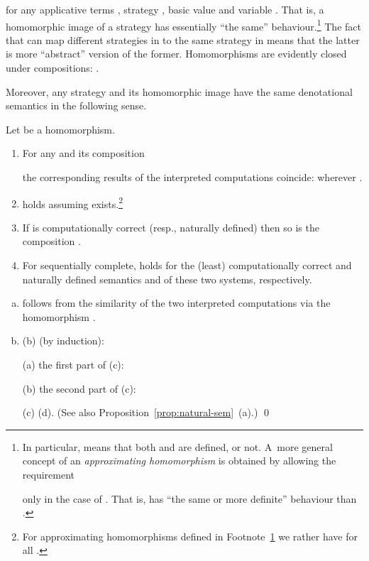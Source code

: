 \documentclass[fleqn]{LMCS}
\theoremstyle{plain}\newtheorem{satz}[thm]{Satz}
\theoremstyle{plain}\newtheorem{hyp}[thm]{Hypothesis}
\theoremstyle{plain}\newtheorem{hyps}[thm]{Hypotheses}
\theoremstyle{definition}\newtheorem{note}[thm]{Note}
\newcommand{\?}{\mbox{?}}
\begin{document}
for any applicative terms , strategy , basic value  and 
variable . 
That is, a homomorphic image of a strategy has essentially ``the same'' behaviour.\footnote{\label{foot:approx-hom} 
In particular,  means that both 
 and  are defined, or not. 
A~more general concept of an \emph{approximating homomorphism} 
is obtained by allowing the requirement 
 
only in the case of . 
That is,  has ``the same or more definite'' behaviour than .  
}
The fact that  can map different strategies in  to the same strategy 
in  means that the latter is more ``abstract'' version of the former. 
Homomorphisms are evidently closed under compositions: 
.


 
Moreover, any strategy  and its homomorphic image  
have the same denotational semantics in the following sense. 
\begin{prop}\label{prop:homomorphism-and-semantics}
Let  be a homomorphism. 
\begin{enumerate}[\em(a)]
\item For any  and its composition 

the corresponding results of 
the interpreted computations coincide:  
wherever . 

\item  holds
assuming 
 exists.\footnote{For approximating homomorphisms defined in Footnote~\ref{foot:approx-hom} 
we rather have 
 for all .
}



\item If  is computationally correct 
(resp., naturally defined) then so is the composition 
. 

\item For  
sequentially complete, 
 holds 
for the (least) computationally correct and naturally defined semantics 
 and  of these two systems, respectively. 
\end{enumerate}
\end{prop}
\proof \hfill
\begin{enumerate}[(a)]
\item follows from the similarity of the two interpreted computations 
via the homomorphism .

\setcounter{enumi}{0}
\item  (b)
(by induction):

\setcounter{enumi}{0}
\item[(a)]  
the first part of (c):

\item[(b)]  
the second part of (c):

\item[(c)]   
(d). (See also Proposition~\ref{prop:natural-sem}~(a).)
\qed
\end{enumerate}
\end{document}
